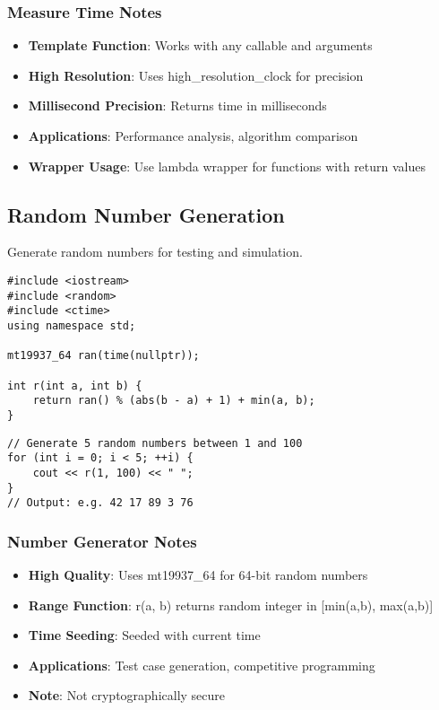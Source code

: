 \documentclass[11pt,a4paper]{article}
\begin{document}
\subsubsection*{Measure Time Notes}
\begin{itemize}
\item \textbf{Template Function}: Works with any callable and arguments
\item \textbf{High Resolution}: Uses high\_resolution\_clock for precision
\item \textbf{Millisecond Precision}: Returns time in milliseconds
\item \textbf{Applications}: Performance analysis, algorithm comparison
\item \textbf{Wrapper Usage}: Use lambda wrapper for functions with return values
\end{itemize}

\newpage

\subsection{Random Number Generation}
Generate random numbers for testing and simulation.

\begin{lstlisting}[caption={Random Number Generator}]
#include <iostream>
#include <random>
#include <ctime>
using namespace std;

mt19937_64 ran(time(nullptr));

int r(int a, int b) {
    return ran() % (abs(b - a) + 1) + min(a, b);
}
\end{lstlisting}

\begin{lstlisting}[caption={Random Number Generator Example Usage}]
// Generate 5 random numbers between 1 and 100
for (int i = 0; i < 5; ++i) {
    cout << r(1, 100) << " ";
}
// Output: e.g. 42 17 89 3 76
\end{lstlisting}

\subsubsection*{Number Generator Notes}
\begin{itemize}
\item \textbf{High Quality}: Uses mt19937\_64 for 64-bit random numbers
\item \textbf{Range Function}: r(a, b) returns random integer in [min(a,b), max(a,b)]
\item \textbf{Time Seeding}: Seeded with current time
\item \textbf{Applications}: Test case generation, competitive programming
\item \textbf{Note}: Not cryptographically secure
\end{itemize}
\end{document}
